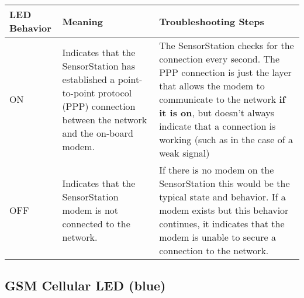 \documentclass[
]{article}
\begin{document}
\begin{longtable}[]{@{}lll@{}}
\toprule
\begin{minipage}[b]{0.26\columnwidth}\raggedright
LED Behavior\strut
\end{minipage} & \begin{minipage}[b]{0.32\columnwidth}\raggedright
Meaning\strut
\end{minipage} & \begin{minipage}[b]{0.33\columnwidth}\raggedright
Troubleshooting Steps\strut
\end{minipage}\tabularnewline
\midrule
\endhead
\begin{minipage}[t]{0.26\columnwidth}\raggedright
ON\strut
\end{minipage} & \begin{minipage}[t]{0.32\columnwidth}\raggedright
Indicates that the SensorStation has established a point-to-point
protocol (PPP) connection between the network and the on-board
modem.\strut
\end{minipage} & \begin{minipage}[t]{0.33\columnwidth}\raggedright
The SensorStation checks for the connection every second. The PPP
connection is just the layer that allows the modem to communicate to the
network \textbf{if it is on}, but doesn't always indicate that a
connection is working (such as in the case of a weak signal)\strut
\end{minipage}\tabularnewline
\begin{minipage}[t]{0.26\columnwidth}\raggedright
OFF\strut
\end{minipage} & \begin{minipage}[t]{0.32\columnwidth}\raggedright
Indicates that the SensorStation modem is not connected to the
network.\strut
\end{minipage} & \begin{minipage}[t]{0.33\columnwidth}\raggedright
If there is no modem on the SensorStation this would be the typical
state and behavior. If a modem exists but this behavior continues, it
indicates that the modem is unable to secure a connection to the
network.\strut
\end{minipage}\tabularnewline
\bottomrule
\end{longtable}

\hypertarget{gsm-cellular-led-blue}{%
\subsection{GSM Cellular LED (blue)}\label{gsm-cellular-led-blue}}
\end{document}

